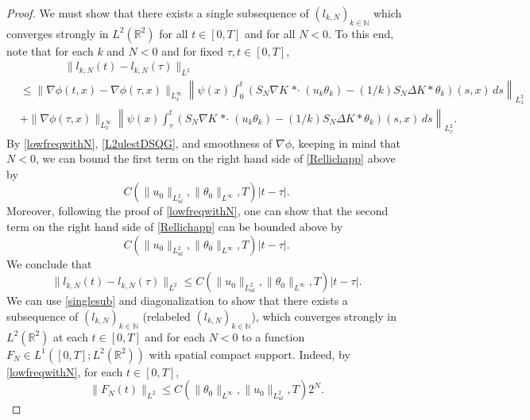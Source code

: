 \documentclass[11pt,reqno,xcolor=svgnames]{amsart}
\def\R{{\mathbb R}}
\def\N{{\mathbb N}}
\theoremstyle{plain}
\theoremstyle{definition}
\theoremstyle{plain}
\theoremstyle{remark}
\newcommand{\stardot}{{\mathop{* \cdot}}}
\begin{document}
\begin{proof}
We must show that there exists a single subsequence of $(l_{k,N})_{k\in\N}$ which converges strongly in $L^2(\R^2)$ for all $t\in [0,T]$ and for all $N<0$.  To this end, note that for each $k$ and $N<0$ and for fixed $\tau,t\in[0,T]$, 
\begin{equation}\label{Rellichapp}
\begin{split}
&\qquad\qquad \|l_{k,N}(t) - l_{k,N}(\tau)\|_{L^2}\\
&\leq  \|\nabla\phi(t,x)-\nabla\phi(\tau,x)\|_{L_x^\infty} \left\|\psi(x)\int_0^t \left( S_{N}\nabla K \stardot (u_k\theta_k) - (1/k) S_{N}\Delta K \ast \theta_k\right)(s,x) \, ds \right\|_{L^2_x} \\
&+  \|\nabla\phi(\tau,x)\|_{L_x^\infty}\left\|\psi(x)\int_{\tau}^t \left( S_{N}\nabla K \stardot (u_k\theta_k) - (1/k) S_{N}\Delta K \ast \theta_k\right)(s,x) \, ds \right\|_{L^2_x}.
\end{split}
\end{equation}
By \cref{lowfreqwithN}, \cref{L2ulestDSQG}, and smoothness of $\nabla\phi$, keeping in mind that $N<0$, we can bound the first term on the right hand side of \cref{Rellichapp} above by
$$ C(\|u_0\|_{L^2_{ul}}, \|\theta_0\|_{L^{\infty}}, T)|t-\tau|.$$
Moreover, following the proof of \cref{lowfreqwithN}, one can show that the second term on the right hand side of \cref{Rellichapp} can be bounded above by
$$ C(\|u_0\|_{L^2_{ul}}, \|\theta_0\|_{L^{\infty}}, T)|t-\tau|.$$
We conclude that 
\begin{equation}\label{singlesub} \|l_{k,N}(t) - l_{k,N}(\tau)\|_{L^2} \leq C(\|u_0\|_{L^2_{ul}}, \|\theta_0\|_{L^{\infty}}, T)|t-\tau|.
\end{equation}
We can use \cref{singlesub} and diagonalization to show that there exists a subsequence of $(l_{k,N})_{k\in\N}$ (relabeled $(l_{k,N})_{k\in\N}$), which converges strongly in $L^2(\R^2)$ at each $t\in [0,T]$ and for each $N<0$ to a function $F_N \in L^1([0,T]; L^2(\R^2))$ with spatial compact support.  Indeed, by \cref{lowfreqwithN}, for each $t\in [0,T]$,
\begin{equation}\label{FNbound} \| F_N(t)  \|_{L^2} \leq C(\| \theta_0\|_{L^{\infty}}, \| u_0 \|_{L^2_{ul}}, T)2^N.
\end{equation}


\end{proof}
\end{document}
